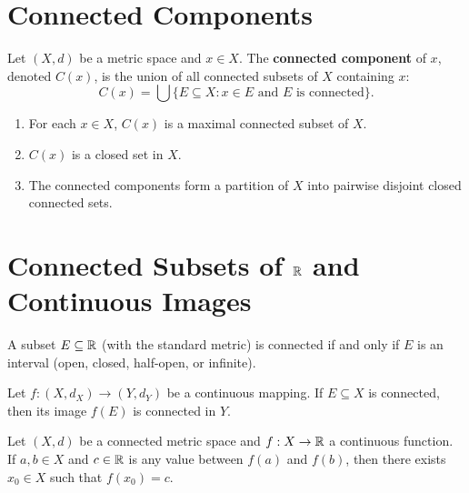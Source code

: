 \section{Connected Components}
\label{sec:components}

\begin{definition}
Let $(X,d)$ be a metric space and $x \in X$. The \textbf{connected component} of $x$, denoted $C(x)$, is the union of all connected subsets of $X$ containing $x$:
\[
C(x) = \bigcup \{E \subseteq X : x \in E \text{ and } E \text{ is connected}\}.
\]
\end{definition}

\begin{theorem}
\begin{enumerate}[label=\rm{(\roman*)}]
    \item For each $x \in X$, $C(x)$ is a maximal connected subset of $X$.
    \item $C(x)$ is a closed set in $X$.
    \item The connected components form a partition of $X$ into pairwise disjoint closed connected sets.
\end{enumerate}
\end{theorem}


\section{Connected Subsets of $\mathbb{R}$ and Continuous Images}
\label{sec:connected_real}

\begin{theorem}
A subset $E \subseteq \mathbb{R}$ (with the standard metric) is connected if and only if $E$ is an interval (open, closed, half-open, or infinite).
\end{theorem}

\begin{theorem}
Let $f: (X, d_X) \to (Y, d_Y)$ be a continuous mapping. If $E \subseteq X$ is connected, then its image $f(E)$ is connected in $Y$.
\end{theorem}

\begin{theorem}
Let $(X,d)$ be a connected metric space and $f: X \to \mathbb{R}$ a continuous function. If $a,b \in X$ and $c \in \mathbb{R}$ is any value between $f(a)$ and $f(b)$, then there exists $x_0 \in X$ such that $f(x_0) = c$.
\end{theorem}
